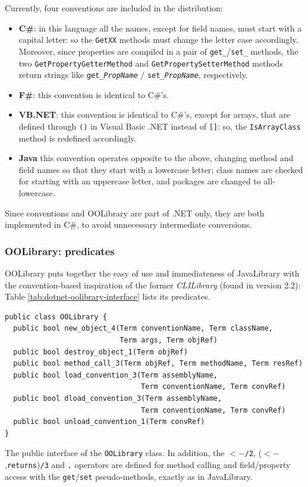 Currently, four conventions are included in the distribution:
\begin{itemize}
  \item \textbf{C\#}: in this language all the names, except for field names, must start with a capital letter: so the \texttt{GetXX} methods must change the letter case accordingly. Moreover, since properties are compiled in a pair of \texttt{get\_}/\texttt{set\_} methods, the two \texttt{GetPropertyGetterMethod} and \texttt{GetPropertySetterMethod} methods return strings like \texttt{get\_\textit{PropName}} / \texttt{set\_\textit{PropName}}, respectively.

  \item \textbf{F\#}: this convention is identical to C\#'s.

  \item \textbf{VB.NET}: this convention is identical to C\#'s, except for arrays, that are defined through \texttt{()} in Visual Basic .NET instead of \texttt{[]}: so, the \texttt{IsArrayClass} method is redefined accordingly.

  \item \textbf{Java} this convention operates opposite to the above, changing method and field names so that they start with a lowercase letter; class names are checked for starting with an uppercase letter, and packages are changed to all-lowercase.
\end{itemize}

\noindent Since conventions and OOLibrary are part of \tuprolog{}.NET only, they are both implemented in C\#, to avoid unnecessary intermediate conversions.

\subsubsection{OOLibrary: predicates}

OOLibrary puts together the easy of use and immediateness of JavaLibrary with the convention-based inspiration of the former \textit{CLILibrary} (found in version 2.2): Table \ref{tab:dotnet-oolibrary-interface} lists its predicates.
%
\begin{table}
{\small
\begin{verbatim}
public class OOLibrary {
  public bool new_object_4(Term conventionName, Term className,
                           Term args, Term objRef)
  public bool destroy_object_1(Term objRef)
  public bool method_call_3(Term objRef, Term methodName, Term resRef)
  public bool load_convention_3(Term assemblyName,
                                Term conventionName, Term convRef)
  public bool dload_convention_3(Term assemblyName,
                                Term conventionName, Term convRef)
  public bool unload_convention_1(Term convRef)
}
\end{verbatim}
}\caption{The public interface of the \texttt{OOLibrary} class. In addition, the \texttt{$<-$/2}, (\texttt{$<-$},\texttt{returns})\texttt{/3} and \texttt{.} operators are defined for method calling and field/property access with the \texttt{get}/\texttt{set} pseudo-methods, exactly as in JavaLibrary.}
\label{tab:dotnet-oolibrary-interface}
\end{table}

